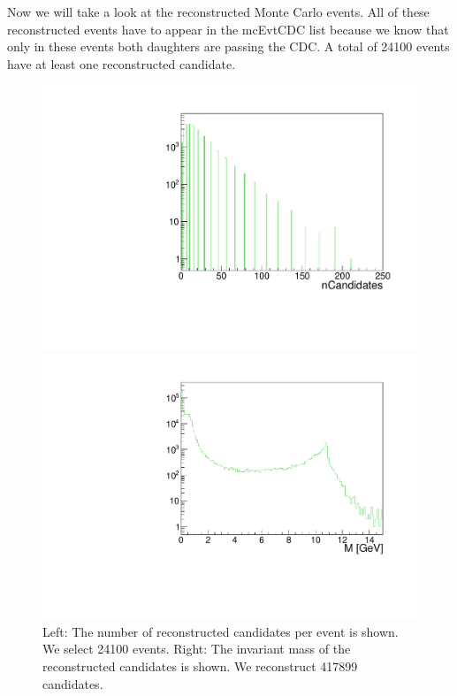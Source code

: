 \documentclass[a4paper,11pt,twosided,final,german,openbib,pdftex,listof=totoc,bibliography=totoc]{scrbook}
\begin{document}
Now we will take a look at the reconstructed Monte Carlo events. All of these reconstructed events have to appear in the mcEvtCDC list because we know that only in these events both daughters are passing the CDC. A total of 24100 events have at least one reconstructed candidate.


\begin{figure}[h!]
	\centering
	\begin{minipage}[b]{0.45\linewidth}
		\centering
		\includegraphics[width=\textwidth]{Cuts/nCandAll.pdf}
	\end{minipage}
	\hspace{0.5cm}
	\begin{minipage}[b]{0.45\linewidth}
		\centering
		\includegraphics[width=\textwidth]{Cuts/Mall.pdf}
	\end{minipage}
	\caption[Number Of Candidates And Invariant Mass (No Cuts)]{Left: The number of reconstructed candidates per event is shown. We select 24100 events.
		Right: The invariant mass of the reconstructed candidates is shown. We reconstruct 417899 candidates.}
	\label{fig:nCandAll}
\end{figure}
\end{document}
